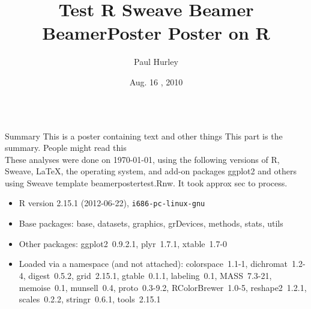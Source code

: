 \documentclass[final,t]{beamer}
\title{Test R Sweave Beamer BeamerPoster Poster on R}
\author[Paul Hurley]{Paul Hurley}
\institute[http://www.paulhurley.co.uk]{http://www.paulhurley.co.uk}
\date[Aug. 16 , 2010]{Aug. 16 , 2010}
\begin{document}


\begin{frame}{}
  \begin{columns}[t]

    \begin{column}{0.32\linewidth}

      \begin{block}{Summary}
        This is a poster containing text and other things
        This part is the summary.  People might read this
        \\
        These analyses were done on \today, using the following versions of R, Sweave\citep{i1608}, \LaTeX, the
operating system, and add-on packages ggplot2\citep{i1606} and others using Sweave template 
beamerpostertest.Rnw.  It took approx  
sec to process.
\scriptsize
\begin{itemize}\raggedright
  \item R version 2.15.1 (2012-06-22), \verb|i686-pc-linux-gnu|
  \item Base packages: base, datasets, graphics, grDevices, methods,
    stats, utils
  \item Other packages: ggplot2~0.9.2.1, plyr~1.7.1, xtable~1.7-0
  \item Loaded via a namespace (and not attached): colorspace~1.1-1,
    dichromat~1.2-4, digest~0.5.2, grid~2.15.1, gtable~0.1.1,
    labeling~0.1, MASS~7.3-21, memoise~0.1, munsell~0.4, proto~0.3-9.2,
    RColorBrewer~1.0-5, reshape2~1.2.1, scales~0.2.2, stringr~0.6.1,
    tools~2.15.1
\end{itemize}\normalsize
      \end{block}


\end{column}
\end{columns}
\end{frame}
\end{document}
